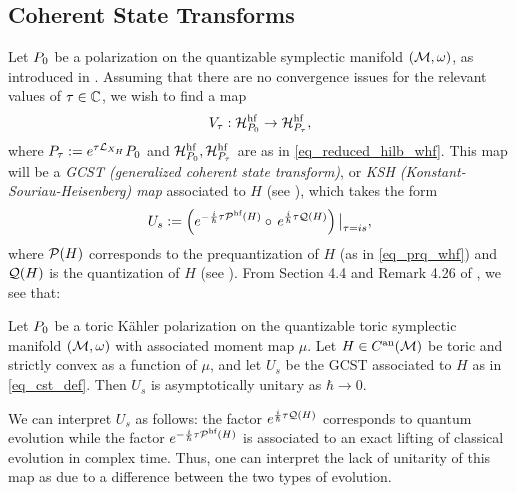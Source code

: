 \documentclass[notas.tex]{subfiles} 				%
\begin{document}
\subsection{Coherent State Transforms} \label{sec_lifting}
Let $P_0$ be a polarization on the quantizable symplectic manifold $(\mathcal{M}, \omega)$, as introduced in . Assuming that there are no convergence issues for the relevant values of $\tau \in \mathbb{C}$, we wish to find a map
\[V_\tau: \mathcal{H}^{\text{hf}}_{P_0} \to \mathcal{H}^{\text{hf}}_{P_\tau},\]
where $P_\tau := e^{\tau \mathcal{L}_{X_H}}P_0$ and $\mathcal{H}^{\text{hf}}_{P_0}, \mathcal{H}^{\text{hf}}_{P_\tau}$ are as in 
\eqref{eq_reduced_hilb_whf}. This map will be a \emph{GCST (generalized coherent state transform)}, or \emph{KSH (Konstant-Souriau-Heisenberg) map} associated to $H$ (see \cite{kirwin_complex_2013}), which takes the form
\begin{equation} \label{eq_cst_def}
U_s := \left ( e^{-\frac{i}{\hbar} \tau \prqhf{H}} \circ e^{\frac{i}{\hbar} \tau \q{H}} \right )\big|_{\tau = is},
\end{equation}
where $\mathcal{P}(H)$ corresponds to the prequantization of $H$ (as in \eqref{eq_prq_whf}) and $\mathcal{Q}(H)$ is the quantization of $H$ (see ). From Section 4.4 and Remark 4.26 of \cite{kirwin_complex_2013}, we see that:
\begin{thm} \label{thm_gcst_asymp_unitarity}
	Let $P_0$ be a toric Kähler polarization on the quantizable toric symplectic manifold $(\mathcal{M}, \omega)$ with associated moment map $\mu$. Let $H \in C^{\text{an}}(\mathcal{M})$ be toric and strictly convex as a function of $\mu$, and let $U_s$ be the GCST associated to $H$ as in \eqref{eq_cst_def}. Then $U_{s}$ is asymptotically unitary as $\hbar \to 0$.
\end{thm}
\begin{rem} \label{rem_gcst_interpretation}
	We can interpret $U_s$ as follows: the factor $e^{\frac{i}{\hbar} \tau \mathcal{Q}(H)}$ corresponds to quantum evolution while the factor $e^{-\frac{i}{\hbar} \tau \mathcal{\mathcal{P}^\text{hf}}(H)}$ is associated to an exact lifting of classical evolution in complex time. Thus, one can interpret the lack of unitarity of this map as due to a difference between the two types of evolution.
\end{rem}

\end{document}
